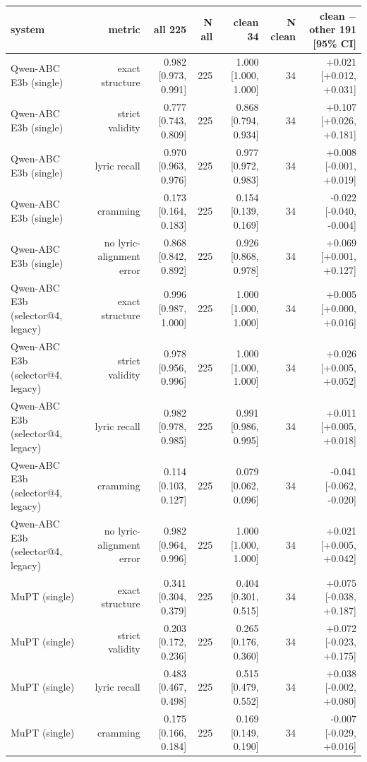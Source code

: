 \begin{table}[t]
\centering
\small
\begin{tabular}{lrrrrrr}
\toprule
system & metric & all 225 & N all & clean 34 & N clean & clean $-$ other 191 [95\% CI] \\
\midrule
Qwen-ABC E3b (single) & exact structure & 0.982 [0.973, 0.991] & 225 & 1.000 [1.000, 1.000] & 34 & +0.021 [+0.012, +0.031] \\
Qwen-ABC E3b (single) & strict validity & 0.777 [0.743, 0.809] & 225 & 0.868 [0.794, 0.934] & 34 & +0.107 [+0.026, +0.181] \\
Qwen-ABC E3b (single) & lyric recall & 0.970 [0.963, 0.976] & 225 & 0.977 [0.972, 0.983] & 34 & +0.008 [-0.001, +0.019] \\
Qwen-ABC E3b (single) & cramming & 0.173 [0.164, 0.183] & 225 & 0.154 [0.139, 0.169] & 34 & -0.022 [-0.040, -0.004] \\
Qwen-ABC E3b (single) & no lyric-alignment error & 0.868 [0.842, 0.892] & 225 & 0.926 [0.868, 0.978] & 34 & +0.069 [+0.001, +0.127] \\
Qwen-ABC E3b (selector@4, legacy) & exact structure & 0.996 [0.987, 1.000] & 225 & 1.000 [1.000, 1.000] & 34 & +0.005 [+0.000, +0.016] \\
Qwen-ABC E3b (selector@4, legacy) & strict validity & 0.978 [0.956, 0.996] & 225 & 1.000 [1.000, 1.000] & 34 & +0.026 [+0.005, +0.052] \\
Qwen-ABC E3b (selector@4, legacy) & lyric recall & 0.982 [0.978, 0.985] & 225 & 0.991 [0.986, 0.995] & 34 & +0.011 [+0.005, +0.018] \\
Qwen-ABC E3b (selector@4, legacy) & cramming & 0.114 [0.103, 0.127] & 225 & 0.079 [0.062, 0.096] & 34 & -0.041 [-0.062, -0.020] \\
Qwen-ABC E3b (selector@4, legacy) & no lyric-alignment error & 0.982 [0.964, 0.996] & 225 & 1.000 [1.000, 1.000] & 34 & +0.021 [+0.005, +0.042] \\
MuPT (single) & exact structure & 0.341 [0.304, 0.379] & 225 & 0.404 [0.301, 0.515] & 34 & +0.075 [-0.038, +0.187] \\
MuPT (single) & strict validity & 0.203 [0.172, 0.236] & 225 & 0.265 [0.176, 0.360] & 34 & +0.072 [-0.023, +0.175] \\
MuPT (single) & lyric recall & 0.483 [0.467, 0.498] & 225 & 0.515 [0.479, 0.552] & 34 & +0.038 [-0.002, +0.080] \\
MuPT (single) & cramming & 0.175 [0.166, 0.184] & 225 & 0.169 [0.149, 0.190] & 34 & -0.007 [-0.029, +0.016] \\

\end{tabular}
\end{table}
